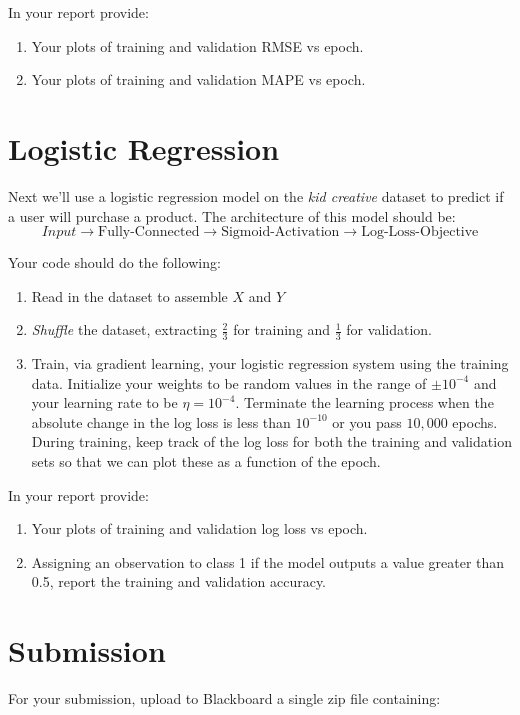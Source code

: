 \documentclass[12pt]{article}
\begin{document}
\noindent
In your report provide:
\begin{enumerate}
\item Your plots of training and validation RMSE vs epoch.
\item Your plots of training and validation MAPE vs epoch.
\end{enumerate}

\newpage
\section{Logistic Regression}\label{linreg}
Next we'll use a logistic regression model on the \emph{kid creative} dataset to predict if a user will purchase a product.   The architecture of this model should be:
$$Input \rightarrow \textrm{Fully-Connected} \rightarrow \textrm{Sigmoid-Activation} \rightarrow \textrm{Log-Loss-Objective}$$

\noindent
Your code should do the following:
\begin{enumerate}
\item Read in the dataset to assemble $X$ and $Y$
\item \emph{Shuffle} the dataset, extracting $\frac{2}{3}$ for training and $\frac{1}{3}$ for validation.
\item Train, via gradient learning, your logistic regression system using the training data.  Initialize your weights to be random values in the range of $\pm 10^{-4}$ and your learning rate to be $\eta=10^{-4}$.  Terminate the learning process when the absolute change in the log loss  is less than $10^{-10}$ or you pass $10,000$ epochs.  During training, keep track of the log loss for both the training and validation sets so that we can plot these as a function of the epoch.
\end{enumerate}

\noindent
In your report provide:
\begin{enumerate}
\item Your plots of training and validation log loss vs epoch.
\item Assigning an observation to class 1 if the model outputs a value greater than 0.5, report the training and validation accuracy.
\end{enumerate}

\newpage
\section*{Submission}
For your submission, upload to Blackboard a single zip file containing:
\end{document}
